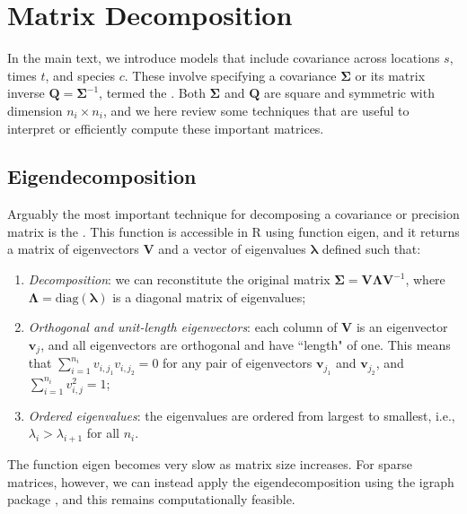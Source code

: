 \section{Matrix Decomposition} 

In the main text, we introduce models that include covariance across locations \(s\), times \(t\), and species \(c\).  These involve specifying a covariance \(\mathbf{\Sigma}\) or its matrix inverse \(\mathbf{Q = \Sigma}^{-1}\), termed the .  Both \(\mathbf{\Sigma}\) and \(\mathbf{Q}\) are square and symmetric with dimension \(n_i \times n_i\), and we here review some techniques that are useful to interpret or efficiently compute these important matrices.

\subsection{Eigendecomposition} \label{sec:Appendix_eigendecomposition}

Arguably the most important technique for decomposing a covariance or precision matrix is the .  This function is accessible in R using function \colorbox{backcolour}{eigen}, and it returns a matrix of eigenvectors \(\mathbf{V}\) and a vector of eigenvalues \(\mathbf{\lambda}\) defined such that:
\begin{enumerate}
    \item \textit{Decomposition}:  we can reconstitute the original matrix \(\mathbf{\Sigma = V \Lambda V}^{-1} \), where \(\mathbf{\Lambda} = \text{diag}(\mathbf{\lambda}) \) is a diagonal matrix of eigenvalues;   

    \item \textit{Orthogonal and unit-length eigenvectors}: each column of \(\mathbf{V}\) is an eigenvector \(\mathbf{v}_j\), and all eigenvectors are orthogonal and have ``length" of one.  This means that \(\sum_{i=1}^{n_i} v_{i,j_1} v_{i,j_2} = 0\) for any pair of eigenvectors \(\mathbf{v}_{j_1}\) and \(\mathbf{v}_{j_2}\), and \(\sum_{i=1}^{n_i} v_{i,j}^2 = 1 \);

    \item \textit{Ordered eigenvalues}: the eigenvalues are ordered from largest to smallest, i.e., \( \lambda_i > \lambda_{i+1}\) for all \(n_i\). 
\end{enumerate}
The function \colorbox{backcolour}{eigen} becomes very slow as matrix size increases.  For sparse matrices, however, we can instead apply the eigendecomposition using the \colorbox{backcolour}{igraph} package \cite{csardi_igraph_2006}, and this remains computationally feasible.  

